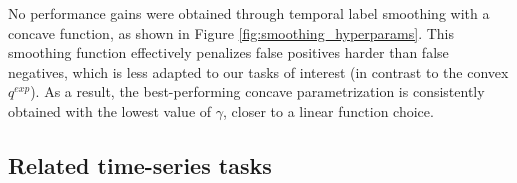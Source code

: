 \documentclass[nohyperref]{article}
\newcommand{\TODO}[1]{{\textbf{\color{green} TODO: #1}}}
\newcommand{\TODO}[1]{}
\begin{document}
No performance gains were obtained through temporal label smoothing with a concave function, as shown in Figure \ref{fig:smoothing_hyperparams}. This smoothing function effectively penalizes false positives harder than false negatives, which is less adapted to our tasks of interest (in contrast to the convex $q^{exp}$). As a result, the best-performing concave parametrization is consistently obtained with the lowest value of $\gamma$, closer to a linear function choice.



\subsection{Related time-series tasks} \label{appendix:related_tasks}

\begin{comment}
    

\paragraph{Comparison to survival analysis.} 
\TODO{}
Survival analysis consists of statistical methods concerned with predicting the probability of a certain event taking place over time \citep{collett2015modelling}. In our formalism outlined in Section \ref{sec:problem_formalism}, the corresponding task is to regress the time of the next event $t_e$ based on patient information accumulated up to time $t$. To recover early event prediction, a threshold on the hazard model can thus be applied to determine whether an event will happen within our horizon of interest $h$. Modeling constraints imposed in survival analysis improve time-to-event prediction performance over traditional regression methods, which supports our approach to leverage the temporal structure of our comparable task. Interestingly, recent developments in survival modeling to deal with dynamic predictions have been addressed with multi-horizon prediction \citep{jarrett2019dynamic}.

Still, distinctions must be highlighted between our adverse event prediction problem and the typical experimental setup for survival analysis: in our case, multiple events can occur over the course of a patient's stay, with unknown patient states during and immediately after event occurrence. This results in complex, informative censoring patterns and challenges common assumptions in survival analysis, which can therefore not be directly applied to our task.
\end{comment}
\end{document}
